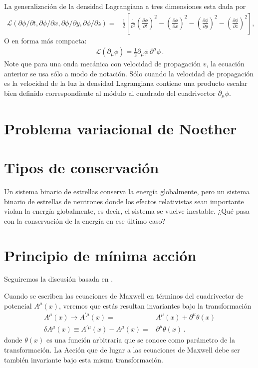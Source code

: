 \begin{frame}
La generalización de la densidad Lagrangiana a tres dimensiones esta dada por
\begin{align}
  \label{eq:dlc3d}
  \mathcal{L}(\partial\phi/\partial t,\partial\phi/\partial x,\partial\phi/\partial y,\partial\phi/\partial z)
=&\frac{1}{2}
\left[
  \frac{1}{v^2}\left(\frac{\partial\phi}{\partial t}\right)^2-\left(\frac{\partial\phi}{\partial x}\right)^2-\left(\frac{\partial\phi}{\partial y}\right)^2-\left(\frac{\partial\phi}{\partial z}\right)^2
\right],
\end{align}
O en forma más compacta:
\begin{align}
  \mathcal{L}(\partial_{\mu} \phi)=  \frac{1}{2}{\partial_\mu\phi}\,{\partial^\mu\phi}\,.
\end{align}
Note que para una onda mecánica con velocidad de propagación $v$, la ecuación anterior se usa sólo a modo de notación. Sólo cuando la velocidad de propagación es la velocidad de la luz la densidad Lagrangiana contiene una producto escalar bien definido correspondiente al módulo al cuadrado del cuadrivector $\partial_{\mu}\phi$.
\end{frame}



\section{Problema variacional de Noether}

\section{Tipos de conservación }
Un sistema binario de estrellas conserva la energía globalmente, pero un sistema binario de estrellas de neutrones donde los efectos relativistas sean importante violan la energía globalmente, es decir, el sistema se vuelve inestable. ¿Qué pasa con la conservación de la energía en ese último caso?

\section{Principio de mínima acción}
\label{sec:principio-de-minima-call}


Seguiremos la discusión basada en \cite{Brading:2000hc,Brading:2003nv,Sundermeyer:2014kha}.

Cuando se escriben las ecuaciones de Maxwell en términos del cuadrivector de potencial $A^{\mu}(x)$, veremos que estás resultan invariantes bajo la transformación
\begin{align}
  A^{\mu}(x)\to A^{\prime\mu}(x)= &  A^{\mu}(x) +\partial^{\mu} \theta(x) \nonumber\\
    \delta A^{\mu}(x)\equiv A^{\prime\mu}(x) -A^{\mu}(x)=& \partial^{\mu} \theta(x)\,.
\end{align}
donde $\theta(x)$ es una función arbitraria que se conoce como parámetro de la transformación. La Acción que de lugar a las ecuaciones de Maxwell debe ser también invariante bajo esta misma transformación. 

